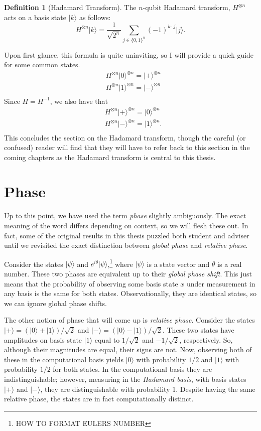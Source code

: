 \documentclass[12pt,twoside]{reedthesis}
\theoremstyle{definition}
\newtheorem{definition}[theorem]{Definition}
\newcommand{\ketz}{\ensuremath{\lvert 0\rangle}\xspace}
\newcommand{\keto}{\ensuremath{\lvert 1\rangle}\xspace}
\newcommand{\ket}[1]{\ensuremath{\lvert #1\rangle}\xspace}
\newcommand{\Hplus}{\ensuremath{\lvert + \rangle}\xspace}
\newcommand{\Hminus}{\ensuremath{\lvert- \rangle}\xspace}
\begin{document}
\begin{definition}[Hadamard Transform] The $n$-qubit Hadamard transform, $H^{\otimes n}$ acts on a basis state $\ket{k}$ as follows:
\begin{equation*}
H^{\otimes n} \ket{k} = \frac{1}{\sqrt{2^n}} \sum_{j \in \{0,1\}^n} (-1)^{k \cdot j} \ket{j}.
\end{equation*}
\end{definition}
Upon first glance, this formula is quite uninviting, so I will provide a quick guide for some common states. 
\begin{align*}
& H^{\otimes n} \ketz^{\otimes n} = \Hplus^{\otimes n} \\
& H^{\otimes n} \keto^{\otimes n} = \Hminus^{\otimes n} \\
\end{align*}
Since $H = H^{-1}$, we also have that
\begin{align*}
& H^{\otimes n} \Hplus^{\otimes n} =  \ketz^{\otimes n} \\
& H^{\otimes n} \Hminus^{\otimes n} = \keto^{\otimes n}. \\
\end{align*}
This concludes the section on the Hadamard transform, though the careful (or confused) reader will find that they will have to refer back to this section in the coming chapters as the Hadamard transform is central to this thesis. 

\section{Phase}
Up to this point, we have used the term \textit{phase} slightly ambiguously. The exact meaning of the word differs depending on context, so we will flesh these out. In fact, some of the original results in this thesis puzzled both student and adviser until we revisited the exact distinction between \textit{global phase} and \textit{relative phase}.

Consider the states $\ket{\psi}$ and $e^{i \theta}\ket{\psi}$,\footnote{HOW TO FORMAT EULERS NUMBER} where $\ket{\psi}$ is a state vector and $\theta$ is a real number. These two phases are equivalent up to their \textit{global phase shift}. This just means that the probability of observing some basis state $x$ under measurement in any basis is the same for both states. Observationally, they are identical states, so we can ignore global phase shifts. 

The other notion of phase that will come up is \textit{relative phase}. Consider the states $\Hplus = (\ketz + \keto)/\sqrt{2}$ and $\Hminus = (\ketz- \keto)/\sqrt{2}$. These two states have amplitudes on basis state $\keto$ equal to $1/\sqrt{2}$ and $-1/\sqrt{2}$, respectively. So, although their magnitudes are equal, their signs are not. Now, observing both of these in the computational basis yields $\ketz$ with probability $1/2$ and $\keto$ with probability $1/2$ for both states. In the computational basis they are indistinguishable; however, measuring in the \textit{Hadamard basis}, with basis states $\Hplus$ and $\Hminus$, they are distinguishable with probability 1. Despite having the same relative phase, the states are in fact computationally distinct.
\end{document}
